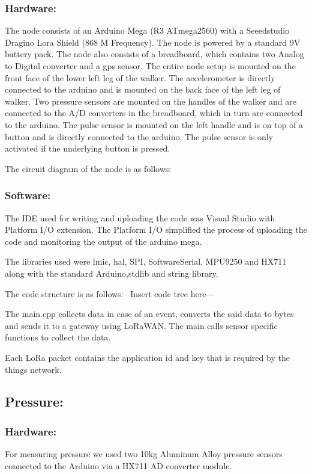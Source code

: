 \subsubsection{Hardware:}
The node consists of an Arduino Mega (R3 ATmega2560) with a Seeedstudio Dragino Lora Shield (868 M Frequency). The node is powered by a standard 9V battery pack. The node also consists of a breadboard, which contains two Analog to Digital converter and a gps sensor. The entire node setup is mounted on the front face of the lower left leg of the walker. The accelerometer is directly connected to the arduino and is mounted on the back face of the left leg of walker. Two pressure sensors are mounted on the handles of the walker and are connected to the A/D converters in the breadboard, which in turn are connected to the arduino. The pulse sensor is mounted on the left handle and is on top of a button and is directly connected to the arduino. The pulse sensor is only activated if the underlying button is pressed. 

The circuit diagram of the node is as follows:



\subsubsection{Software:}
The IDE used for writing and uploading the code was Visual Studio with Platform I/O extension. The Platform I/O simplified the process of uploading the code and monitoring the output of the arduino mega.

The libraries used were lmic, hal, SPI, SoftwareSerial, MPU9250 and HX711 along with the standard Arduino,stdlib and string library.

The code structure is as follows:
--Insert code tree here---

The main.cpp collects data in case of an event, converts the said data to bytes and sends it to a gateway using LoRaWAN. The main calls sensor specific functions to collect the data. 

Each LoRa packet contains the application id and key that is required by the things network.

\subsection{Pressure:}

\subsubsection{Hardware:}
For measuring pressure we used two 10kg Aluminum Alloy pressure sensors connected to the Arduino via a HX711 AD converter module. 


